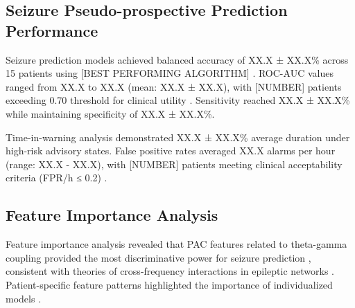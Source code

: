 \subsection{Seizure Pseudo-prospective Prediction Performance}
Seizure prediction models achieved balanced accuracy of XX.X ± XX.X\% across 15 patients using [BEST PERFORMING ALGORITHM] \cite{Messaoud2021RandomFCR,Hussein2022MultiChannelVTE}. ROC-AUC values ranged from XX.X to XX.X (mean: XX.X ± XX.X), with [NUMBER] patients exceeding 0.70 threshold for clinical utility \cite{Kuhlmann2018SeizurePA}. Sensitivity reached XX.X ± XX.X\% while maintaining specificity of XX.X ± XX.X\%.

Time-in-warning analysis demonstrated XX.X ± XX.X\% average duration under high-risk advisory states. False positive rates averaged XX.X alarms per hour (range: XX.X - XX.X), with [NUMBER] patients meeting clinical acceptability criteria (FPR/h ≤ 0.2) \cite{Freestone2015SeizurePSBF}.

\subsection{Feature Importance Analysis}
Feature importance analysis revealed that PAC features related to theta-gamma coupling provided the most discriminative power for seizure prediction \cite{Ahn2022TheFIT,Radiske2020CrossFrequencyPCAR}, consistent with theories of cross-frequency interactions in epileptic networks \cite{Ponzi2023ThetagammaPAAT}. Patient-specific feature patterns highlighted the importance of individualized models \cite{Aldahr2023PatientSpecificPPL,Pinto2021APAP}.


\label{sec:results}

